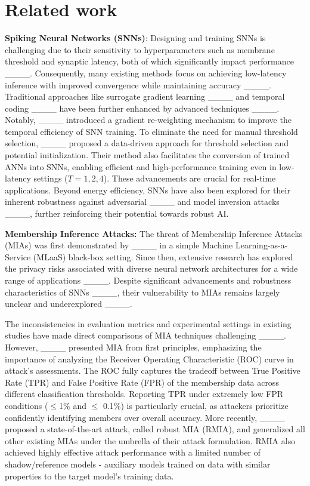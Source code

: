 \section{Related work}
\label{sec:related_work}

\textbf{Spiking Neural Networks (SNNs)}: 
Designing and training SNNs is challenging due to their sensitivity to hyperparameters such as membrane threshold and synaptic latency, both of which significantly impact performance ____. Consequently, many existing methods focus on achieving low-latency inference with improved convergence while maintaining accuracy ____. Traditional approaches like surrogate gradient learning ____ and temporal coding ____ have been further enhanced by advanced techniques ____. Notably, ____ introduced a gradient re-weighting mechanism to improve the temporal efficiency of SNN training.
%
To eliminate the need for manual threshold selection, ____ proposed a data-driven approach for threshold selection and potential initialization. Their method also facilitates the conversion of trained ANNs into SNNs, enabling efficient and high-performance training even in low-latency settings ($T=1,2,4$). These advancements are crucial for real-time applications. Beyond energy efficiency, SNNs have also been explored for their inherent robustness against adversarial ____ and model inversion attacks ____, further reinforcing their potential towards robust AI.

\textbf{Membership Inference Attacks: }The threat of Membership Inference Attacks (MIAs) was first demonstrated by ____ in a simple Machine Learning-as-a-Service (MLaaS) black-box setting. Since then, extensive research has explored the privacy risks associated with diverse neural network architectures for a wide range of applications ____. Despite significant advancements and robustness characteristics of SNNs ____, their vulnerability to MIAs remains largely unclear and underexplored ____.

The inconsistencies in evaluation metrics and experimental settings in existing studies have made direct comparisons of MIA techniques challenging ____. However, ____ presented MIA from first principles, emphasizing the importance of analyzing the Receiver Operating Characteristic (ROC) curve in attack's assessments. The ROC fully captures the tradeoff between True Positive Rate (TPR) and False Positive Rate (FPR) of the membership data across different classification thresholds. Reporting TPR under extremely low FPR conditions ($\leq$1\% and $\leq$ 0.1\%) is particularly crucial, as attackers prioritize confidently identifying members over overall accuracy. More recently, ____ proposed a state-of-the-art attack, called robust MIA (RMIA), and generalized all other existing MIAs under the umbrella of their attack formulation. RMIA also achieved highly effective attack performance with a limited number of shadow/reference models - auxiliary models trained on data with similar properties to the target model's training data.

